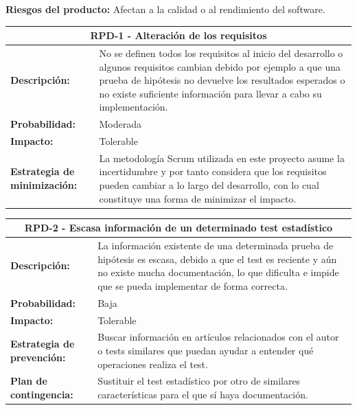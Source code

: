 \noindent
\textbf{Riesgos del producto:} Afectan a la calidad o al rendimiento del software.

\begin{table}[H]
	\begin{tabular}{| p{4cm}| p{10cm} |}
		\hline
		\multicolumn{2}{|c|}{\textbf{RPD-1} - Alteración de los requisitos} \\ \hline
		\textbf{Descripción:} & No se definen todos los requisitos al inicio del desarrollo o algunos requisitos cambian debido por ejemplo a que una prueba de hipótesis no devuelve los resultados esperados o no existe suficiente información para llevar a cabo su implementación. \\ \hline
		\textbf{Probabilidad:} & Moderada \\ \hline
		\textbf{Impacto:} & Tolerable \\ \hline
		\textbf{Estrategia de minimización:} & La metodología Scrum utilizada en este proyecto asume la incertidumbre y por tanto considera que los requisitos pueden cambiar a lo largo del desarrollo, con lo cual constituye una forma de minimizar el impacto. \\ \hline
	\end{tabular}
\end{table}

\begin{table}[H]
	\begin{tabular}{| p{4cm}| p{10cm} |}
		\hline
		\multicolumn{2}{|c|}{\textbf{RPD-2} - Escasa información de un determinado test estadístico} \\ \hline
		\textbf{Descripción:} & La información existente de una determinada prueba de hipótesis es escasa, debido a que el test es reciente y aún no existe mucha documentación, lo que dificulta e impide que se pueda implementar de forma correcta. \\ \hline
		\textbf{Probabilidad:} & Baja \\ \hline
		\textbf{Impacto:} & Tolerable \\ \hline
		\textbf{Estrategia de prevención:} & Buscar información en artículos relacionados con el autor o tests similares que puedan ayudar a entender qué operaciones realiza el test. \\ \hline
		\textbf{Plan de contingencia:} & Sustituir el test estadístico por otro de similares características para el que sí haya documentación. \\ \hline
	\end{tabular}
\end{table}

